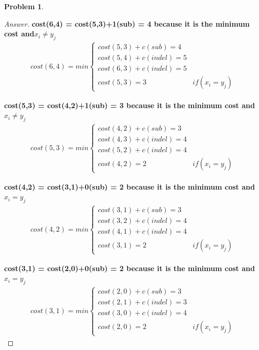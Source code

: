 \documentclass[11pt]{article}
\theoremstyle{definition}
\theoremstyle{definition}
\newtheorem{required}{Problem}
\theoremstyle{definition}
\begin{document}
\begin{required}
\begin{proof}[Answer]
\textbf{cost(6,4) = cost(5,3)+1(sub) = 4 because it is the minimum cost and$ x_i \neq y_j$}\\
\begin{align*}
cost(6,4) = min\begin{cases}
cost(5,3) + c(sub) = 4 \\
cost(5,4) + c(indel) = 5\\
cost(6,3) + c(indel) = 5\\
cost(5,3) = 3 & if (x_i = y_j)
\end{cases}
\end{align*}

\textbf{cost(5,3) = cost(4,2)+1(sub) = 3 because it is the minimum cost and$ x_i \neq y_j$}\\
\begin{align*}
cost(5,3) = min\begin{cases}
cost(4,2) + c(sub) = 3 \\
cost(4,3) + c(indel) = 4\\
cost(5,2) + c(indel) = 4\\
cost(4,2) = 2 & if (x_i = y_j)
\end{cases}
\end{align*}

\textbf{cost(4,2) = cost(3,1)+0(sub) = 2 because it is the minimum cost and$ x_i = y_j$}\\
\begin{align*}
cost(4,2) = min\begin{cases}
cost(3,1) + c(sub) = 3 \\
cost(3,2) + c(indel) = 4\\
cost(4,1) + c(indel) = 4\\
cost(3,1) = 2 & if (x_i = y_j)
\end{cases}
\end{align*}

\textbf{cost(3,1) = cost(2,0)+0(sub) = 2 because it is the minimum cost and$ x_i = y_j$}\\
\begin{align*}
cost(3,1) = min\begin{cases}
cost(2,0) + c(sub) = 3 \\
cost(2,1) + c(indel) = 3\\
cost(3,0) + c(indel) = 4\\
cost(2,0) = 2 & if (x_i = y_j)
\end{cases}
\end{align*}


\end{proof}
\end{required}
\end{document}
